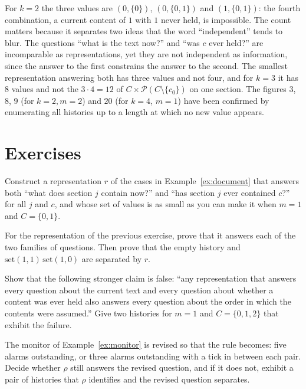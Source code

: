 For $k=2$ the three values are $(0,\{0\})$, $(0,\{0,1\})$ and $(1,\{0,1\})$: the fourth combination, a current content of $1$ with $1$ never held, is impossible. The count matters because it separates two ideas that the word ``independent'' tends to blur. The questions ``what is the text now?'' and ``was $c$ ever held?'' are incomparable as representations, yet they are not independent as information, since the answer to the first constrains the answer to the second. The smallest representation answering both has three values and not four, and for $k=3$ it has $8$ values and not the $3\cdot 4=12$ of $C\times\mathcal P(C\setminus\{c_0\})$ on one section. The figures $3$, $8$, $9$ (for $k=2,m=2$) and $20$ (for $k=4$, $m=1$) have been confirmed by enumerating all histories up to a length at which no new value appears.

\section*{Exercises}

\begin{exercise}
Construct a representation $r$ of the cases in Example~\ref{ex:document} that answers both ``what does section $j$ contain now?'' and ``has section $j$ ever contained $c$?'' for all $j$ and $c$, and whose set of values is as small as you can make it when $m=1$ and $C=\{0,1\}$.
\end{exercise}

\begin{exercise}
For the representation of the previous exercise, prove that it answers each of the two families of questions. Then prove that the empty history and $\mathrm{set}(1,1)\,\mathrm{set}(1,0)$ are separated by $r$.
\end{exercise}

\begin{exercise}
Show that the following stronger claim is false: ``any representation that answers every question about the current text and every question about whether a content was ever held also answers every question about the order in which the contents were assumed.'' Give two histories for $m=1$ and $C=\{0,1,2\}$ that exhibit the failure.
\end{exercise}

\begin{exercise}
The monitor of Example~\ref{ex:monitor} is revised so that the rule becomes: five alarms outstanding, or three alarms outstanding with a tick in between each pair. Decide whether $\rho$ still answers the revised question, and if it does not, exhibit a pair of histories that $\rho$ identifies and the revised question separates.
\end{exercise}


